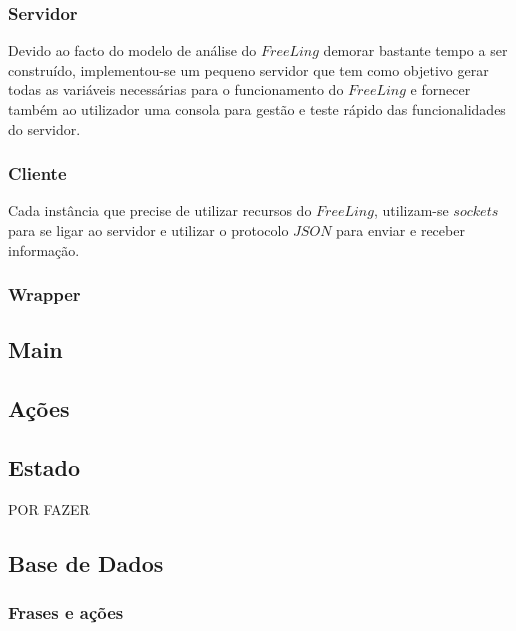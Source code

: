 \documentclass[11pt]{article} %
\begin{document}
\subsubsection{Servidor}

\hspace{11pt} Devido ao facto do modelo de análise do $FreeLing$ demorar bastante tempo a ser construído, implementou-se um pequeno servidor que tem como objetivo gerar todas as variáveis necessárias para o funcionamento do $FreeLing$ e fornecer também ao utilizador uma consola para gestão e teste rápido das funcionalidades do servidor.

\subsubsection{Cliente}

\hspace{11pt} Cada instância que precise de utilizar recursos do $FreeLing$, utilizam-se $sockets$ para se ligar ao servidor e utilizar o protocolo $JSON$ para enviar e receber informação.

\subsubsection{Wrapper}

\hspace{11pt} 

\subsection{Main}

\subsection{Ações}

\subsection{Estado}

\hspace{11pt} POR FAZER

\subsection{Base de Dados}

\subsubsection{Frases e ações}
\end{document}
